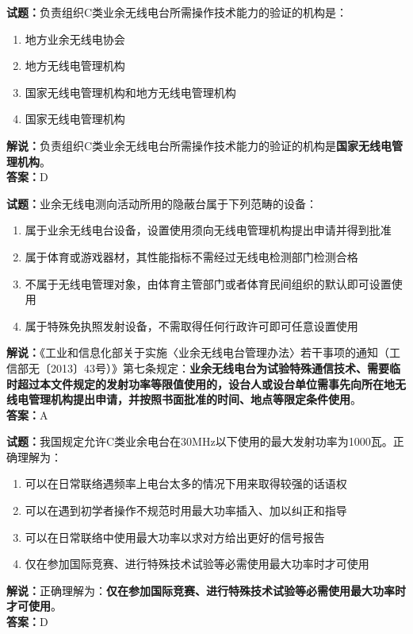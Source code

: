\documentclass{ctexbook}
\begin{document}
\vspace{\baselineskip}

\noindent\textbf{试题：}负责组织C类业余无线电台所需操作技术能力的验证的机构是：
\begin{enumerate}[leftmargin=3em]
  \item 地方业余无线电协会
  \item 地方无线电管理机构
  \item 国家无线电管理机构和地方无线电管理机构
  \item 国家无线电管理机构
\end{enumerate}
\noindent\textbf{解说：}负责组织C类业余无线电台所需操作技术能力的验证的机构是\textbf{国家无线电管理机构}。\\\noindent\textbf{答案：}D

\vspace{\baselineskip}

\noindent\textbf{试题：}业余无线电测向活动所用的隐蔽台属于下列范畴的设备：
\begin{enumerate}[leftmargin=3em]
  \item 属于业余无线电台设备，设置使用须向无线电管理机构提出申请并得到批准
  \item 属于体育或游戏器材，其性能指标不需经过无线电检测部门检测合格
  \item 不属于无线电管理对象，由体育主管部门或者体育民间组织的默认即可设置使用
  \item 属于特殊免执照发射设备，不需取得任何行政许可即可任意设置使用
\end{enumerate}
\noindent\textbf{解说：}《工业和信息化部关于实施〈业余无线电台管理办法〉若干事项的通知（工信部无〔2013〕43号）》第七条规定：\textbf{业余无线电台为试验特殊通信技术、需要临时超过本文件规定的发射功率等限值使用的，设台人或设台单位需事先向所在地无线电管理机构提出申请，并按照书面批准的时间、地点等限定条件使用}。\\\noindent\textbf{答案：}A

\vspace{\baselineskip}

\noindent\textbf{试题：}我国规定允许C类业余电台在30\unit{\MHz}以下使用的最大发射功率为1000瓦。正确理解为：
\begin{enumerate}[leftmargin=3em]
  \item 可以在日常联络遇频率上电台太多的情况下用来取得较强的话语权
  \item 可以在遇到初学者操作不规范时用最大功率插入、加以纠正和指导
  \item 可以在日常联络中使用最大功率以求对方给出更好的信号报告
  \item 仅在参加国际竞赛、进行特殊技术试验等必需使用最大功率时才可使用
\end{enumerate}
\noindent\textbf{解说：}正确理解为：\textbf{仅在参加国际竞赛、进行特殊技术试验等必需使用最大功率时才可使用}。\\\noindent\textbf{答案：}D
\end{document}
